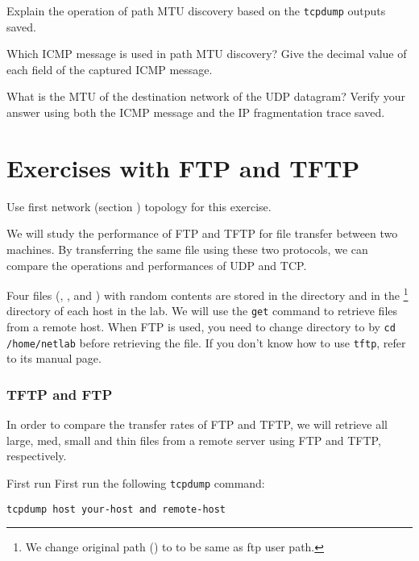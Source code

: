 \documentclass{../UTNetLab}
\begin{document}
    \begin{report}
    \item Explain the operation of path MTU discovery based on the \lstinline{tcpdump} outputs saved.
    
    \item Which ICMP message is used in path MTU discovery? Give the decimal value of each field of the captured ICMP message.
    
    \item What is the MTU of the destination network of the UDP datagram? Verify your answer using both the ICMP message and the IP fragmentation trace saved.
    \end{report}

\part{Exercises with FTP and TFTP}
    Use first network (section ) topology for this exercise.

    We will study the performance of FTP and TFTP for file transfer between two machines.
    By transferring the same file using these two protocols, we can compare the operations and performances of UDP and TCP. 

    Four files (, ,  and ) with random contents are stored in the  directory and in the \footnote{We change original path () to  to be same as ftp user path.} directory of each host in the lab.
    We will use the \lstinline{get} command to retrieve files from a remote host.
    When FTP is used, you need to change directory to  by \lstinline{cd /home/netlab} before retrieving the file.
    If you don’t know how to use \lstinline{tftp}, refer to its manual page.


\section{TFTP and FTP}
    In order to compare the transfer rates of FTP and TFTP, we will retrieve all large, med, small and thin files from a remote server using FTP and TFTP, respectively.

    First run First run the following \lstinline{tcpdump} command:
    \begin{lstlisting}[emph={your-host,remote-host}]
tcpdump host your-host and remote-host
    \end{lstlisting}
\end{document}
